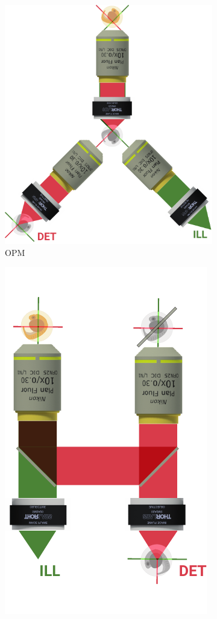 \begin{figure}\centering
  \begin{subfigure}[t]{\textwidth}
    \centering
    \includegraphics{single_objectives/opm}
    \caption{\gls{OPM}~\cite{dunsby_optically_2008}}\label{fig:single_objectives/opm}
  \end{subfigure}
  \centering
  \begin{subfigure}[t]{0.475\textwidth}
    \centering
    \includegraphics{single_objectives/atomic_mirror}

\end{subfigure}
\end{figure}
